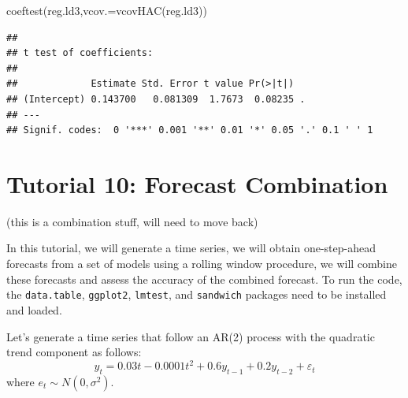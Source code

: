 \documentclass[
  12pt,
  oneside]{book}
\newenvironment{Shaded}{\begin{snugshade}}{\end{snugshade}}
\newcommand{\AttributeTok}[1]{\textcolor[rgb]{0.77,0.63,0.00}{#1}}
\newcommand{\FunctionTok}[1]{\textcolor[rgb]{0.00,0.00,0.00}{#1}}
\newcommand{\NormalTok}[1]{#1}
\begin{document}
\begin{Shaded}
\begin{Highlighting}[]
\FunctionTok{coeftest}\NormalTok{(reg.ld3,}\AttributeTok{vcov.=}\FunctionTok{vcovHAC}\NormalTok{(reg.ld3))}
\end{Highlighting}
\end{Shaded}

\begin{verbatim}
## 
## t test of coefficients:
## 
##             Estimate Std. Error t value Pr(>|t|)  
## (Intercept) 0.143700   0.081309  1.7673  0.08235 .
## ---
## Signif. codes:  0 '***' 0.001 '**' 0.01 '*' 0.05 '.' 0.1 ' ' 1
\end{verbatim}

\hypertarget{tutorial-10-forecast-combination}{%
\chapter*{Tutorial 10: Forecast Combination}\label{tutorial-10-forecast-combination}}

(this is a combination stuff, will need to move back)

In this tutorial, we will generate a time series, we will obtain one-step-ahead forecasts from a set of models using a rolling window procedure, we will combine these forecasts and assess the accuracy of the combined forecast. To run the code, the \texttt{data.table}, \texttt{ggplot2}, \texttt{lmtest}, and \texttt{sandwich} packages need to be installed and loaded.

Let's generate a time series that follow an AR(2) process with the quadratic trend component as follows:
\[y_t = 0.03t-0.0001t^2+0.6y_{t-1}+0.2y_{t-2}+\varepsilon_t\]
where \(e_{t} \sim N(0,\sigma^2)\).
\end{document}
